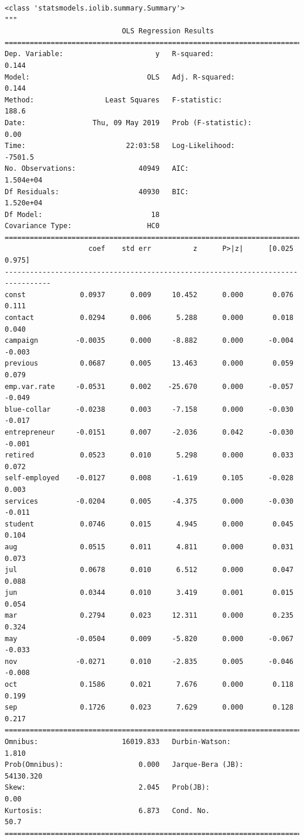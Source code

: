 \documentclass[8pt,onecolumn,aps,pra]{revtex4-1}
\begin{document}
    
    \begin{verbatim}
<class 'statsmodels.iolib.summary.Summary'>
"""
                            OLS Regression Results                            
==============================================================================
Dep. Variable:                      y   R-squared:                       0.144
Model:                            OLS   Adj. R-squared:                  0.144
Method:                 Least Squares   F-statistic:                     188.6
Date:                Thu, 09 May 2019   Prob (F-statistic):               0.00
Time:                        22:03:58   Log-Likelihood:                -7501.5
No. Observations:               40949   AIC:                         1.504e+04
Df Residuals:                   40930   BIC:                         1.520e+04
Df Model:                          18                                         
Covariance Type:                  HC0                                         
=================================================================================
                    coef    std err          z      P>|z|      [0.025      0.975]
---------------------------------------------------------------------------------
const             0.0937      0.009     10.452      0.000       0.076       0.111
contact           0.0294      0.006      5.288      0.000       0.018       0.040
campaign         -0.0035      0.000     -8.882      0.000      -0.004      -0.003
previous          0.0687      0.005     13.463      0.000       0.059       0.079
emp.var.rate     -0.0531      0.002    -25.670      0.000      -0.057      -0.049
blue-collar      -0.0238      0.003     -7.158      0.000      -0.030      -0.017
entrepreneur     -0.0151      0.007     -2.036      0.042      -0.030      -0.001
retired           0.0523      0.010      5.298      0.000       0.033       0.072
self-employed    -0.0127      0.008     -1.619      0.105      -0.028       0.003
services         -0.0204      0.005     -4.375      0.000      -0.030      -0.011
student           0.0746      0.015      4.945      0.000       0.045       0.104
aug               0.0515      0.011      4.811      0.000       0.031       0.073
jul               0.0678      0.010      6.512      0.000       0.047       0.088
jun               0.0344      0.010      3.419      0.001       0.015       0.054
mar               0.2794      0.023     12.311      0.000       0.235       0.324
may              -0.0504      0.009     -5.820      0.000      -0.067      -0.033
nov              -0.0271      0.010     -2.835      0.005      -0.046      -0.008
oct               0.1586      0.021      7.676      0.000       0.118       0.199
sep               0.1726      0.023      7.629      0.000       0.128       0.217
==============================================================================
Omnibus:                    16019.833   Durbin-Watson:                   1.810
Prob(Omnibus):                  0.000   Jarque-Bera (JB):            54130.320
Skew:                           2.045   Prob(JB):                         0.00
Kurtosis:                       6.873   Cond. No.                         50.7
==============================================================================


\end{verbatim}
\end{document}

